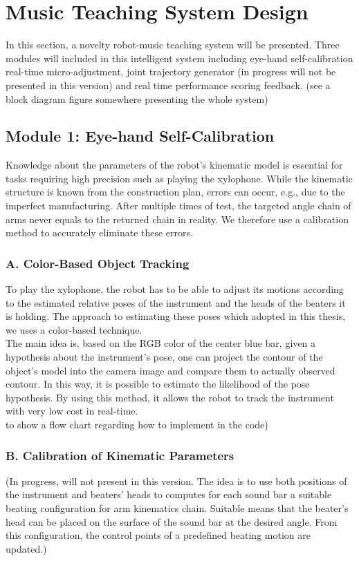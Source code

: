 \section{Music Teaching System Design}
In this section, a novelty robot-music teaching system will be presented. Three 
modules will included in this intelligent system including eye-hand 
self-calibration real-time micro-adjustment, joint trajectory generator (in 
progress will not be presented in this version) and real time performance 
scoring feedback. (see a block diagram figure somewhere presenting the whole 
system)

\subsection{Module 1: Eye-hand Self-Calibration}
Knowledge about the parameters of the robot's kinematic model is essential for 
tasks requiring high precision such as playing the xylophone. While the kinematic 
structure is known from the construction plan, errors can occur, e.g., due to the 
imperfect manufacturing. After multiple times of test, the targeted angle chain 
of arms never equals to the returned chain in reality. We therefore use a 
calibration method to accurately eliminate these errors. 

\subsubsection{A. Color-Based Object Tracking}
To play the xylophone, the robot has to be able to adjust its motions according to
the estimated relative poses of the instrument and the heads of the beaters it is 
holding. The approach to estimating these poses which adopted in this thesis, we 
uses a color-based technique.\\
The main idea is, based on the RGB color of the center blue bar, given a hypothesis 
about the instrument's pose, one can project the contour of the object's model into the 
camera image and compare them to actually observed contour. In this way, it is possible 
to estimate the likelihood of the pose hypothesis. By using this method, it allows
the robot to track the instrument with very low cost in real-time.\\
to show a flow chart regarding how to implement in the code)

\subsubsection{B. Calibration of Kinematic Parameters}
(In progress, will not present in this version. The idea is to use both positions 
of the instrument and beaters' heads to computes for each sound bar a suitable 
beating configuration for arm kinematics chain. Suitable means that the beater's 
head can be placed on the surface of the sound bar at the desired angle. From 
this configuration, the control points of a predefined beating motion are updated.)\\ 

